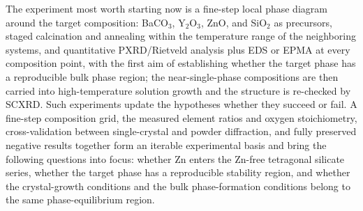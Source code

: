 The experiment most worth starting now is a fine-step local phase diagram around the target composition: BaCO$_3$, Y$_2$O$_3$, ZnO, and SiO$_2$ as precursors, staged calcination and annealing within the temperature range of the neighboring systems, and quantitative PXRD\slash Rietveld analysis plus EDS or EPMA at every composition point, with the first aim of establishing whether the target phase has a reproducible bulk phase region; the near-single-phase compositions are then carried into high-temperature solution growth and the structure is re-checked by SCXRD. Such experiments update the hypotheses whether they succeed or fail. A fine-step composition grid, the measured element ratios and oxygen stoichiometry, cross-validation between single-crystal and powder diffraction, and fully preserved negative results together form an iterable experimental basis and bring the following questions into focus: whether Zn enters the Zn-free tetragonal silicate series, whether the target phase has a reproducible stability region, and whether the crystal-growth conditions and the bulk phase-formation conditions belong to the same phase-equilibrium region.
